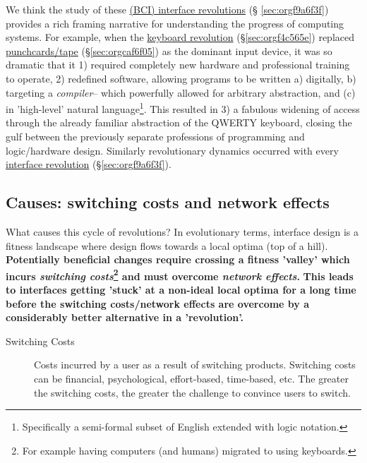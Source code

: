 \documentclass[logo,bsc,singlespacing,parskip]{infthesis}
\begin{document}
We think the study of these \hyperref[sec:orgf9a6f3f]{(BCI) interface revolutions} (§  \ref{sec:orgf9a6f3f}) provides a rich framing narrative for understanding the progress of computing systems.
For example, when the \hyperref[sec:orgf4c565e]{keyboard revolution} (\S \ref{sec:orgf4c565e}) replaced  \hyperref[sec:orgcaf6f05]{punchcards/tape} (\S \ref{sec:orgcaf6f05}) as the dominant input device, it was so dramatic that it 1) required completely new hardware and professional training to operate, 2) redefined software, allowing programs to be written a) digitally, b) targeting a \emph{compiler}-- which powerfully allowed for arbitrary abstraction, and (c) in 'high-level' natural language\footnote{Specifically a semi-formal subset of English extended with logic notation.}. This resulted in 3) a fabulous widening of access through the already familiar abstraction of the QWERTY keyboard, closing the gulf between the previously separate professions of programming and logic/hardware design.
Similarly revolutionary dynamics occurred with every \hyperref[sec:orgf9a6f3f]{interface revolution} (\S \ref{sec:orgf9a6f3f}).
\subsection{Causes: switching costs and network effects}
\label{sec:org93edc00}
What causes this cycle of revolutions?
In evolutionary terms, interface design is a fitness landscape where design flows towards a local optima (top of a hill).
\textbf{Potentially beneficial changes require crossing a fitness 'valley' which incurs \emph{switching costs}\footnote{For example having computers (and humans) migrated to using keyboards.} and must overcome \emph{network effects}.}
\textbf{This leads to interfaces getting 'stuck' at a non-ideal local optima for a long time before the switching costs/network effects are overcome by a considerably better alternative in a 'revolution'.}

\begin{mdframed}
\begin{description}
\item[{Switching Costs\label{switching costs}}] Costs incurred by a user as a result of switching products.
Switching costs can be financial, psychological, effort-based, time-based, etc.
The greater the switching costs, the greater the challenge to convince users to switch.
\end{description}
\end{mdframed}
\end{document}
